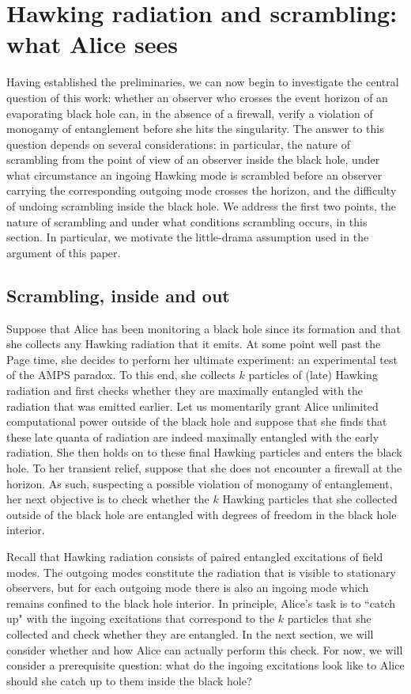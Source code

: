 \documentclass[a4paper,11pt]{article}
\theoremstyle{definition}
\begin{document}
\section{Hawking radiation and scrambling: what Alice sees}

Having established the preliminaries, we can now begin to investigate the central question of this work: whether an observer who crosses the event horizon of an evaporating black hole can, in the absence of a firewall, verify a violation of monogamy of entanglement before she hits the singularity.
The answer to this question depends on several considerations: in particular, the nature of scrambling from the point of view of an observer inside the black hole, under what circumstance an ingoing Hawking mode is scrambled before an observer carrying the corresponding outgoing mode crosses the horizon, and the difficulty of undoing scrambling inside the black hole.
We address the first two points, the nature of scrambling and under what conditions scrambling occurs, in this section. In particular, we motivate the little-drama assumption used in the argument of this paper.

\subsection{Scrambling, inside and out}
\label{sec:innout}

Suppose that Alice has been monitoring a black hole since its formation and that she collects any Hawking radiation that it emits.
At some point well past the Page time, she decides to perform her ultimate experiment: an experimental test of the AMPS paradox.
To this end, she collects $k$ particles of (late) Hawking radiation and first checks whether they are maximally entangled with the radiation that was emitted earlier.
Let us momentarily grant Alice unlimited computational power outside of the black hole and suppose that she finds that these late quanta of radiation are indeed maximally entangled with the early radiation.
She then holds on to these final Hawking particles and enters the black hole.
To her transient relief, suppose that she does not encounter a firewall at the horizon.
As such, suspecting a possible violation of monogamy of entanglement, her next objective is to check whether the $k$ Hawking particles that she collected outside of the black hole are entangled with degrees of freedom in the black hole interior.

Recall that Hawking radiation consists of paired entangled excitations of field modes.
The outgoing modes constitute the radiation that is visible to stationary observers, but for each outgoing mode there is also an ingoing mode which remains confined to the black hole interior.
In principle, Alice's task is to ``catch up" with the ingoing excitations that correspond to the $k$ particles that she collected and check whether they are entangled.
In the next section, we will consider whether and how Alice can actually perform this check.
For now, we will consider a prerequisite question: what do the ingoing excitations look like to Alice should she catch up to them inside the black hole?
\end{document}
